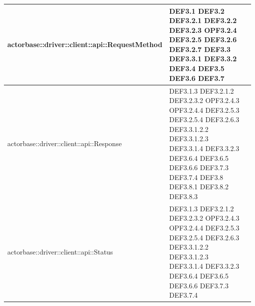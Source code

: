 \documentclass{scalatekids-article}
\begin{document}
\begin{longtable}[H]{|p{11.5cm}|p{5.5cm}|}
\hline
actorbase::driver::client::api::RequestMethod & \multiLineCell[t]{DEF3.1 DEF3.2\\DEF3.2.1 DEF3.2.2\\DEF3.2.3 OPF3.2.4\\DEF3.2.5 DEF3.2.6\\DEF3.2.7 DEF3.3\\DEF3.3.1 DEF3.3.2\\DEF3.4 DEF3.5\\DEF3.6 DEF3.7\\}\\
\hline
actorbase::driver::client::api::Response & \multiLineCell[t]{DEF3.1.3 DEF3.2.1.2\\DEF3.2.3.2 OPF3.2.4.3\\OPF3.2.4.4 DEF3.2.5.3\\DEF3.2.5.4 DEF3.2.6.3\\DEF3.3.1.2.2 DEF3.3.1.2.3\\DEF3.3.1.4 DEF3.3.2.3\\DEF3.6.4 DEF3.6.5\\DEF3.6.6 DEF3.7.3\\DEF3.7.4 DEF3.8\\DEF3.8.1 DEF3.8.2\\DEF3.8.3\\}\\
\hline
actorbase::driver::client::api::Status & \multiLineCell[t]{DEF3.1.3 DEF3.2.1.2\\DEF3.2.3.2 OPF3.2.4.3\\OPF3.2.4.4 DEF3.2.5.3\\DEF3.2.5.4 DEF3.2.6.3\\DEF3.3.1.2.2 DEF3.3.1.2.3\\DEF3.3.1.4 DEF3.3.2.3\\DEF3.6.4 DEF3.6.5\\DEF3.6.6 DEF3.7.3\\DEF3.7.4\\}\\
\hline

\end{longtable}
\end{document}
